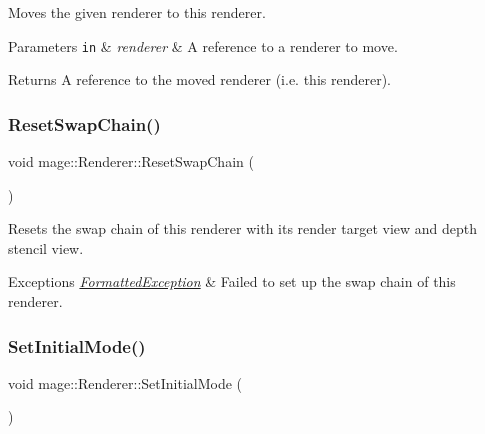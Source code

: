 Moves the given renderer to this renderer.


\begin{DoxyParams}[1]{Parameters}
\mbox{\tt in}  & {\em renderer} & A reference to a renderer to move. \\
\hline
\end{DoxyParams}
\begin{DoxyReturn}{Returns}
A reference to the moved renderer (i.\+e. this renderer). 
\end{DoxyReturn}
\hypertarget{classmage_1_1_renderer_a1c4615559503b339a9cdc6ac17e1e858}{}\label{classmage_1_1_renderer_a1c4615559503b339a9cdc6ac17e1e858} 
\subsubsection{\texorpdfstring{Reset\+Swap\+Chain()}{ResetSwapChain()}}
{\footnotesize\ttfamily void mage\+::\+Renderer\+::\+Reset\+Swap\+Chain (\begin{DoxyParamCaption}{ }\end{DoxyParamCaption})\hspace{0.3cm}{\ttfamily [private]}}

Resets the swap chain of this renderer with its render target view and depth stencil view.


\begin{DoxyExceptions}{Exceptions}
{\em \hyperlink{structmage_1_1_formatted_exception}{Formatted\+Exception}} & Failed to set up the swap chain of this renderer. \\
\hline
\end{DoxyExceptions}
\hypertarget{classmage_1_1_renderer_aff4e08af2ab697c53f1ede6546a86d19}{}\label{classmage_1_1_renderer_aff4e08af2ab697c53f1ede6546a86d19} 
\subsubsection{\texorpdfstring{Set\+Initial\+Mode()}{SetInitialMode()}}
{\footnotesize\ttfamily void mage\+::\+Renderer\+::\+Set\+Initial\+Mode (\begin{DoxyParamCaption}{ }\end{DoxyParamCaption})\hspace{0.3cm}{\ttfamily [noexcept]}}

